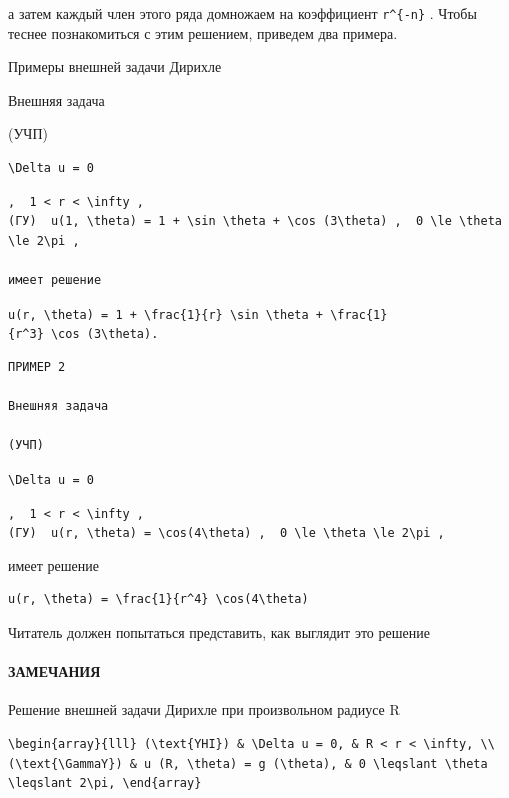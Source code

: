 \documentclass[
  ukrainian,
]{article}
\begin{document}
а затем каждый член этого ряда домножаем на коэффициент
\texttt{r\^{}\{-n\}} . Чтобы теснее познакомиться с этим решением,
приведем два примера.

Примеры внешней задачи Дирихле

Внешняя задача

(УЧП)

\begin{verbatim}
\Delta u = 0
\end{verbatim}

\begin{verbatim}
,  1 < r < \infty ,  
(ГУ)  u(1, \theta) = 1 + \sin \theta + \cos (3\theta) ,  0 \le \theta \le 2\pi ,

имеет решение
\end{verbatim}

\texttt{u(r,\ \textbackslash{}theta)\ =\ 1\ +\ \textbackslash{}frac\{1\}\{r\}\ \textbackslash{}sin\ \textbackslash{}theta\ +\ \textbackslash{}frac\{1\}\{r\^{}3\}\ \textbackslash{}cos\ (3\textbackslash{}theta).}

\begin{verbatim}
ПРИМЕР 2

Внешняя задача

(УЧП)
\end{verbatim}

\texttt{\textbackslash{}Delta\ u\ =\ 0}

\texttt{,\ \ \textquotesingle{}1\ \textless{}\ r\ \textless{}\ \textbackslash{}infty\textquotesingle{}\ ,}
\texttt{(ГУ)\ \ \textquotesingle{}u(r,\ \textbackslash{}theta)\ =\ \textbackslash{}cos(4\textbackslash{}theta)\textquotesingle{}\ ,\ \ \textquotesingle{}0\ \textbackslash{}le\ \textbackslash{}theta\ \textbackslash{}le\ 2\textbackslash{}pi\textquotesingle{}\ ,}

имеет решение

\begin{verbatim}
u(r, \theta) = \frac{1}{r^4} \cos(4\theta)
\end{verbatim}

Читатель должен попытаться представить, как выглядит это решение

\paragraph{ЗАМЕЧАНИЯ}\label{ux437ux430ux43cux435ux447ux430ux43dux438ux44f-5}

Решение внешней задачи Дирихле при произвольном радиусе R

\begin{verbatim}
\begin{array}{lll} (\text{YHI}) & \Delta u = 0, & R < r < \infty, \\ (\text{\GammaY}) & u (R, \theta) = g (\theta), & 0 \leqslant \theta \leqslant 2\pi, \end{array}
\end{verbatim}
\end{document}

